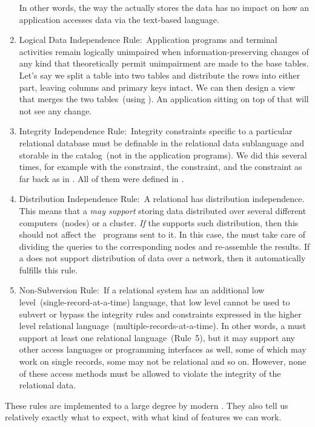 \begin{enumerate}
In other words, the way the  actually stores the data has no impact on how an application accesses data via the text-based language.%
%
\item Logical Data Independence Rule:~Application programs and terminal activities remain logically unimpaired when information-preserving changes of any kind that theoretically permit unimpairment are made to the base tables.
Let's say we split a table into two tables and distribute the rows into either part, leaving columns and primary keys intact.
We can then design a view that merges the two tables~(using ).
An application sitting on top of that will not see any change.%
%
\item Integrity Independence Rule:~Integrity constraints specific to a particular relational database must be definable in the relational data sublanguage and storable in the catalog~(not in the application programs).
We did this several times, for example with the  constraint, the  constraint, and the  constraint as far back as in .
All of them were defined in \sql.
%
\item Distribution Independence Rule:~A relational  has distribution independence.
This means that a  \emph{may support} storing data distributed over several different computers~(nodes) or a cluster.
\emph{If} the  supports such distribution, then this should not affect the \sql\ programs sent to it.
In this case, the  must take care of dividing the queries to the corresponding nodes and re-assemble the results.
If a  does not support distribution of data over a network, then it automatically fulfills this rule.%
%
\item Non-Subversion Rule:~If a relational system has an additional low level~(single-record-at-a-time) language, that low level cannot be used to subvert or bypass the integrity rules and constraints expressed in the higher level relational language~(multiple-records-at-a-time).
In other words, a  must support at least one relational language~(Rule~5), but it may support any other access languages or programming interfaces as well, some of which may work on single records, some may not be relational and so on.
However, none of these access methods must be allowed to violate the integrity of the relational data.%
%
\end{enumerate}%
%
These rules are implemented to a large degree by modern .
They also tell us relatively exactly what to expect, with what kind of features we can work.%
%
\endhsection%
%
